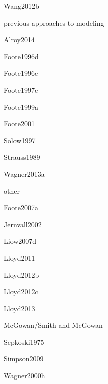 \documentclass[12pt,letterpaper]{article}
\begin{document}
Wang2012b

previous approaches to modeling

Alroy2014

Foote1996d

Foote1996e

Foote1997c

Foote1999a

Foote2001

Solow1997

Strauss1989

Wagner2013a


other

Foote2007a

Jernvall2002

Liow2007d

Lloyd2011

Lloyd2012b

Lloyd2012c

Lloyd2013

McGowan/Smith and McGowan

Sepkoski1975

Simpson2009

Wagner2000h
\end{document}
